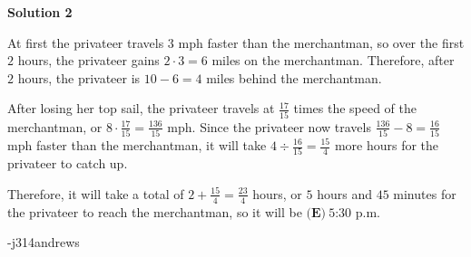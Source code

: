 \begin{enumerate}
\textbf{Solution 2}

At first the privateer travels $3$ mph faster than the merchantman, so over the first $2$ hours, the privateer gains $2 \cdot 3 = 6$ miles on the merchantman.  Therefore, after $2$ hours, the privateer is $10 - 6 = 4$ miles behind the merchantman.

 After losing her top sail, the privateer travels at $\frac{17}{15}$ times the speed of the merchantman, or $8 \cdot \frac{17}{15} = \frac{136}{15}$ mph.  Since the privateer now travels $\frac{136}{15} - 8 = \frac{16}{15}$ mph faster than the merchantman, it will take $4 \div \frac{16}{15} = \frac{15}{4}$ more hours for the privateer to catch up.  

 Therefore, it will take a total of $2 + \frac{15}{4} = \frac{23}{4}$ hours, or $5$ hours and $45$ minutes for the privateer to reach the merchantman, so it will be $\boxed{\textbf{(E)}\ 5\text{:}30\text{ p.m.}}$

 -j314andrews

 


 


\end{enumerate}